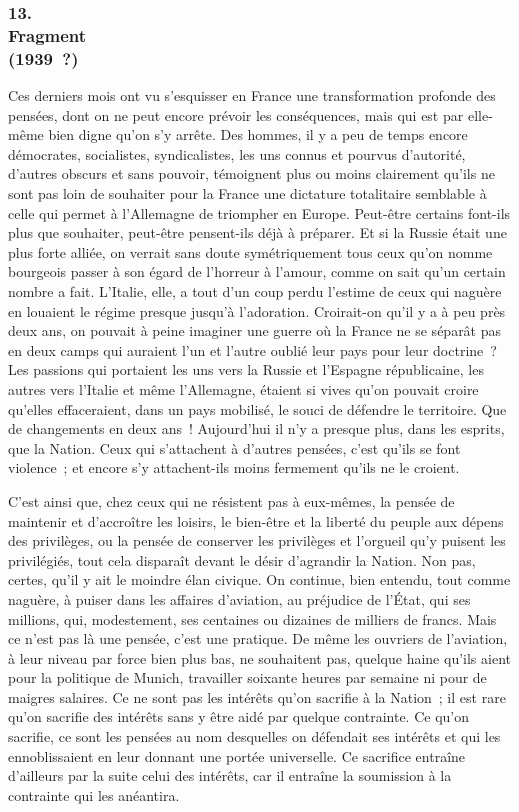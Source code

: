\documentclass[french,twoside]{book} %
\begin{document}
\subsubsection[13. Fragment, (1939 ?)]{13. \\
Fragment \\
(1939 ?)}
\noindent \par
Ces derniers mois ont vu s'esquisser en France une transformation profonde des pensées, dont on ne peut encore prévoir les conséquences, mais qui est par elle-même bien digne qu'on s'y arrête. Des hommes, il y a peu de temps encore démocrates, socialistes, syndicalistes, les uns connus et pourvus d'autorité, d'autres obscurs et sans pouvoir, témoignent plus ou moins clairement qu'ils ne sont pas loin de souhaiter pour la France une dictature totalitaire semblable à celle qui permet à l'Allemagne de triompher en Europe. Peut-être certains font-ils plus que souhaiter, peut-être pensent-ils déjà à préparer. Et si la Russie était une plus forte alliée, on verrait sans doute symétriquement tous ceux qu'on nomme bourgeois passer à son égard de l'horreur à l'amour, comme on sait qu'un certain nombre a fait. L'Italie, elle, a tout d'un coup perdu l'estime de ceux qui naguère en louaient le régime presque jusqu'à l'adoration. Croirait-on qu'il y a à peu près deux ans, on pouvait à peine imaginer une guerre où la France ne se séparât pas en deux camps qui auraient l'un et l'autre oublié leur pays pour leur doctrine ? Les passions qui portaient les uns vers la Russie et l'Espagne républicaine, les autres vers l'Italie et même l'Allemagne, étaient si vives qu'on pouvait croire qu'elles effaceraient, dans un pays mobilisé, le souci de défendre le territoire. Que de changements en deux ans ! Aujourd'hui il n'y a presque plus, dans les esprits, que la Nation. Ceux qui s'attachent à d'autres pensées, c'est qu'ils se font violence ; et encore s'y attachent-ils moins fermement qu'ils ne le croient.\par
C'est ainsi que, chez ceux qui ne résistent pas à eux-mêmes, la pensée de maintenir et d'accroître les loisirs, le bien-être et la liberté du peuple aux dépens des privilèges, ou la pensée de conserver les privilèges et l'orgueil qu'y puisent les privilégiés, tout cela disparaît devant le désir d'agrandir la Nation. Non pas, certes, qu'il y ait le moindre élan civique. On continue, bien entendu, tout comme naguère, à puiser dans les affaires d'aviation, au préjudice de l'État, qui ses millions, qui, modestement, ses centaines ou dizaines de milliers de francs. Mais ce n'est pas là une pensée, c'est une pratique. De même les ouvriers de l'aviation, à leur niveau par force bien plus bas, ne souhaitent pas, quelque haine qu'ils aient pour la politique de Munich, travailler soixante heures par semaine ni pour de maigres salaires. Ce ne sont pas les intérêts qu'on sacrifie à la Nation ; il est rare qu'on sacrifie des intérêts sans y être aidé par quelque contrainte. Ce qu'on sacrifie, ce sont les pensées au nom des­quelles on défendait ses intérêts et qui les ennoblissaient en leur donnant une portée universelle. Ce sacrifice entraîne d'ailleurs par la suite celui des intérêts, car il entraîne la soumission à la contrainte qui les anéantira.\par
\end{document}
